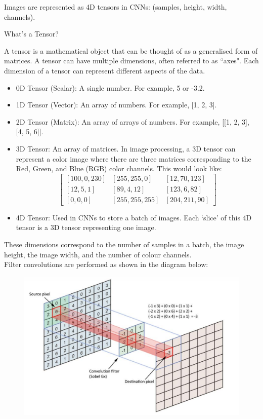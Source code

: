 Images are represented as 4D tensors in CNNs: (samples, height, width, channels).\\

\begin{commentbox}{What's a Tensor?}
    
A tensor is a mathematical object that can be thought of as a generalised form of matrices. A tensor can have multiple dimensions, often referred to as ``axes". Each dimension of a tensor can represent different aspects of the data. 

\begin{itemize}
    \item0D Tensor (Scalar): A single number. For example, 5 or -3.2.
    \item1D Tensor (Vector): An array of numbers. For example, [1, 2, 3].
    \item2D Tensor (Matrix): An array of arrays of numbers. For example, [[1, 2, 3], [4, 5, 6]].
    \item3D Tensor: An array of matrices. In image processing, a 3D tensor can represent a color image where there are three matrices corresponding to the Red, Green, and Blue (RGB) color channels. This would look like: 
    \[
    \begin{bmatrix}
        [100,0,230] & [255,255,0] & [12,70,123]\\
        [12,5,1] & [89,4,12] & [123,6,82]\\
        [0,0,0] & [255,255,255] & [204,211, 90]
    \end{bmatrix}
    \]
    \item4D Tensor: Used in CNNs to store a batch of images. Each `slice' of this 4D tensor is a 3D tensor representing one image.
\end{itemize}
\end{commentbox}

These dimensions correspond to the number of samples in a batch, the image height, the image width, and the number of colour channels.\\

Filter convolutions are performed as shown in the diagram below:
\begin{figure}[H]
    \centering
    \includegraphics[width=0.75\linewidth]{img/CNN_filter.png}
    
    
\end{figure}

